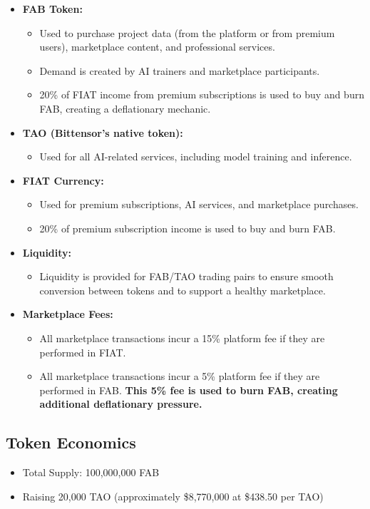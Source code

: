 \begin{itemize}[leftmargin=*]
    \item \textbf{FAB Token:}
    \begin{itemize}
        \item Used to purchase project data (from the platform or from premium users), marketplace content, and professional services.
        \item Demand is created by AI trainers and marketplace participants.
        \item 20\% of FIAT income from premium subscriptions is used to buy and burn FAB, creating a deflationary mechanic.
    \end{itemize}
    \item \textbf{TAO (Bittensor's native token):}
    \begin{itemize}
        \item Used for all AI-related services, including model training and inference.
    \end{itemize}
    \item \textbf{FIAT Currency:}
    \begin{itemize}
        \item Used for premium subscriptions, AI services, and marketplace purchases.
        \item 20\% of premium subscription income is used to buy and burn FAB.
    \end{itemize}
    \item \textbf{Liquidity:}
    \begin{itemize}
        \item Liquidity is provided for FAB/TAO trading pairs to ensure smooth conversion between tokens and to support a healthy marketplace.
    \end{itemize}
    \item \textbf{Marketplace Fees:}
    \begin{itemize}
        \item All marketplace transactions incur a 15\% platform fee if they are performed in FIAT.
        \item All marketplace transactions incur a 5\% platform fee if they are performed in FAB. \textbf{This 5\% fee is used to burn FAB, creating additional deflationary pressure.}
    \end{itemize}
\end{itemize}

\subsection*{Token Economics}
\begin{itemize}[leftmargin=*]
    \item Total Supply: 100,000,000 FAB
    \item Raising 20,000 TAO (approximately \$8,770,000 at \$438.50 per TAO)
\end{itemize}

